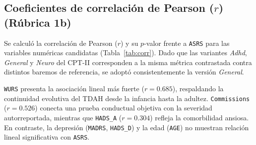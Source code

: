 \documentclass[11pt,letterpaper]{article}
\begin{document}
\subsection{Coeficientes de correlación de Pearson ($r$) (Rúbrica 1b)}

Se calculó la correlación de Pearson ($r$) y su $p$-valor frente a \texttt{ASRS} para las variables numéricas candidatas (Tabla~\ref{tab:corr}). Dado que las variantes \textit{Adhd}, \textit{General} y \textit{Neuro} del CPT-II corresponden a la misma métrica contrastada contra distintos baremos de referencia, se adoptó consistentemente la versión \textit{General}.

\begin{table}[H]
  \centering
  \caption{Principales correlaciones de Pearson ($r$) respecto a \texttt{ASRS}.}
  \label{tab:corr}
\end{table}

\texttt{WURS} presenta la asociación lineal más fuerte ($r = 0.685$), respaldando la continuidad evolutiva del TDAH desde la infancia hasta la adultez. \texttt{Commissions} ($r = 0.526$) conecta una prueba conductual objetiva con la severidad autorreportada, mientras que \texttt{HADS\_A} ($r = 0.304$) refleja la comorbilidad ansiosa. En contraste, la depresión (\texttt{MADRS}, \texttt{HADS\_D}) y la edad (\texttt{AGE}) no muestran relación lineal significativa con \texttt{ASRS}.
\end{document}
